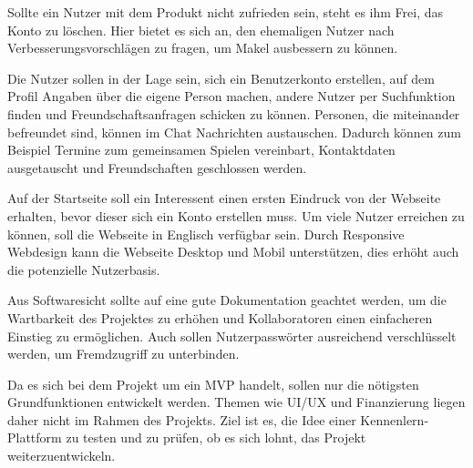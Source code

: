 Sollte ein Nutzer mit dem Produkt nicht zufrieden sein, steht es ihm Frei, das Konto zu löschen.
Hier bietet es sich an, den ehemaligen Nutzer nach Verbesserungsvorschlägen zu fragen, um Makel ausbessern zu können.

Die Nutzer sollen in der Lage sein, sich ein Benutzerkonto erstellen, auf dem Profil Angaben über die eigene Person machen, andere Nutzer per Suchfunktion finden und Freundschaftsanfragen schicken zu können.
Personen, die miteinander befreundet sind, können im Chat Nachrichten austauschen.
Dadurch können zum Beispiel Termine zum gemeinsamen Spielen vereinbart, Kontaktdaten ausgetauscht und Freundschaften geschlossen werden.

Auf der Startseite soll ein Interessent einen ersten Eindruck von der Webseite erhalten, bevor dieser sich ein Konto erstellen muss.
Um viele Nutzer erreichen zu können, soll die Webseite in Englisch verfügbar sein.
Durch Responsive Webdesign %
kann die Webseite Desktop und Mobil unterstützen, dies erhöht auch die potenzielle Nutzerbasis.

Aus Softwaresicht sollte auf eine gute Dokumentation geachtet werden, um die Wartbarkeit des Projektes zu erhöhen und Kollaboratoren einen einfacheren Einstieg zu ermöglichen.
Auch sollen Nutzerpasswörter ausreichend verschlüsselt werden, um Fremdzugriff zu unterbinden.

Da es sich bei dem Projekt um ein MVP handelt, sollen nur die nötigsten Grundfunktionen entwickelt werden.
Themen wie UI/UX und Finanzierung liegen daher nicht im Rahmen des Projekts.
Ziel ist es, die Idee einer Kennenlern-Plattform zu testen und zu prüfen, ob es sich lohnt, das Projekt weiterzuentwickeln. 